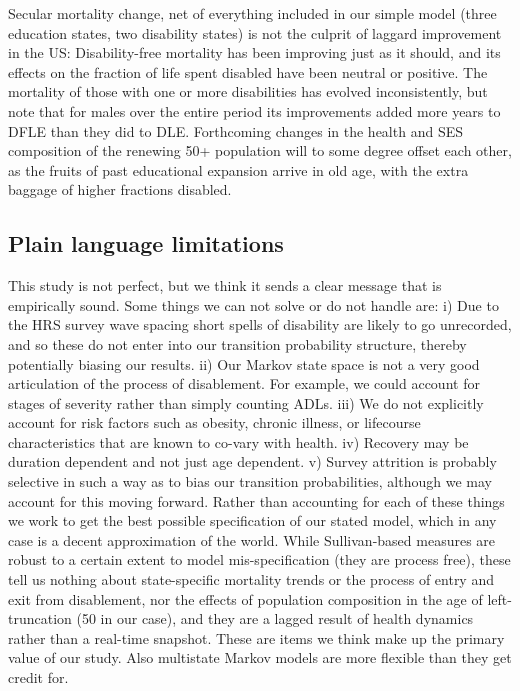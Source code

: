 Secular mortality change, net of everything included in our simple model (three education states, two disability states) is not the culprit of laggard improvement in the US: Disability-free mortality has been improving just as it should, and its effects on the fraction of life spent disabled have been neutral or positive. The mortality of those with one or more disabilities has evolved inconsistently, but note that for males over the entire period its improvements added more years to DFLE than they did to DLE. Forthcoming changes in the health and SES composition of the renewing 50+ population will to some degree offset each other, as the fruits of past educational expansion arrive in old age, with the extra baggage of higher fractions disabled.

\subsection{Plain language limitations}
This study is not perfect, but we think it sends a clear message that is empirically sound. Some things we can not solve or do not handle are: i) Due to the HRS survey wave spacing short spells of disability are likely to go unrecorded, and so these do not enter into our transition probability structure, thereby potentially biasing our results. ii) Our Markov state space is not a very good articulation of the process of disablement. For example, we could account for stages of severity rather than simply counting ADLs. iii) We do not explicitly account for risk factors such as obesity, chronic illness, or lifecourse characteristics that are known to co-vary with health. iv) Recovery may be duration dependent and not just age dependent. v) Survey attrition is probably selective in such a way as to bias our transition probabilities, although we may account for this moving forward. Rather than accounting for each of these things we work to get the best possible specification of our stated model, which in any case is a decent approximation of the world. While Sullivan-based measures are robust to a certain extent to model mis-specification (they are process free), these tell us nothing about state-specific mortality trends or the process of entry and exit from disablement, nor the effects of population composition in the age of left-truncation (50 in our case), and they are a lagged result of health dynamics rather than a real-time snapshot. These are items we think make up the primary value of our study. Also multistate Markov models are more flexible than they get credit for.

